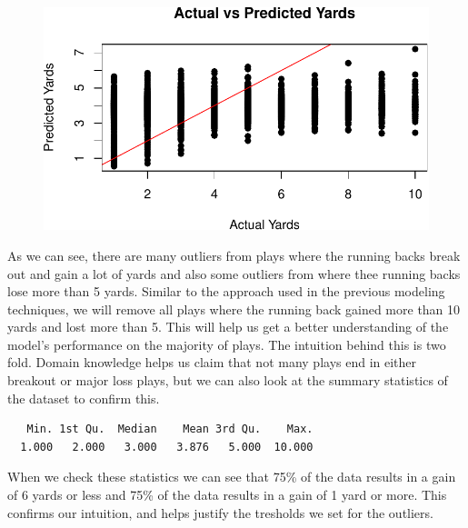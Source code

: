 \documentclass[
  super,
  preprint,
  3p]{elsarticle}
\newenvironment{Shaded}{\begin{snugshade}}{\end{snugshade}}
\newcommand{\FunctionTok}[1]{\textcolor[rgb]{0.28,0.35,0.67}{#1}}
\newcommand{\NormalTok}[1]{\textcolor[rgb]{0.00,0.23,0.31}{#1}}
\newcommand{\SpecialCharTok}[1]{\textcolor[rgb]{0.37,0.37,0.37}{#1}}
\begin{document}
\begin{figure}[H]

{\centering \includegraphics{project_report_files/figure-pdf/unnamed-chunk-52-1.pdf}

}

\end{figure}

As we can see, there are many outliers from plays where the running
backs break out and gain a lot of yards and also some outliers from
where thee running backs lose more than 5 yards. Similar to the approach
used in the previous modeling techniques, we will remove all plays where
the running back gained more than 10 yards and lost more than 5. This
will help us get a better understanding of the model's performance on
the majority of plays. The intuition behind this is two fold. Domain
knowledge helps us claim that not many plays end in either breakout or
major loss plays, but we can also look at the summary statistics of the
dataset to confirm this.

\begin{Shaded}
\end{Shaded}

\begin{verbatim}
   Min. 1st Qu.  Median    Mean 3rd Qu.    Max. 
  1.000   2.000   3.000   3.876   5.000  10.000 
\end{verbatim}

When we check these statistics we can see that 75\% of the data results
in a gain of 6 yards or less and 75\% of the data results in a gain of 1
yard or more. This confirms our intuition, and helps justify the
tresholds we set for the outliers.
\end{document}
